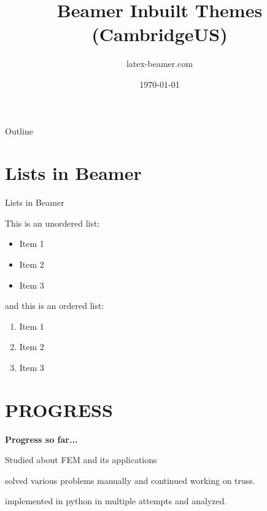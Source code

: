 \documentclass{beamer}
\title{Beamer Inbuilt Themes (CambridgeUS)}
\author{latex-beamer.com}
\date{\today}
\begin{document}
\begin{frame}
    \titlepage 
\end{frame}

\logo{}


\begin{frame}{Outline}
    \tableofcontents
\end{frame}


\section{Lists in Beamer}
\begin{frame}{Lists in Beamer}

This is an unordered list:
\begin{itemize}
    \item Item 1
    \item Item 2
    \item Item 3
\end{itemize}

and this is an ordered list:
\begin{enumerate}
    \item Item 1
    \item Item 2
    \item Item 3
\end{enumerate}

\end{frame}


\section{{PROGRESS}}
\begin{frame}[t]{\textbf{\huge{Progress so far...}}}\vspace{20pt}
\begin{block} {\textbf{}}
   Studied about FEM and its applications
       \end{block}  \vspace{20pt}

\begin{block} {\textbf{}}
    solved various problems manually and  continued working on truss.
       \end{block}  \vspace{20pt}
    \begin{alertblock}{\textbf{}}
         implemented in python in multiple attempts  and analyzed. 
    \end{alertblock}  \vspace{20pt}
\end{frame}
\end{document}
